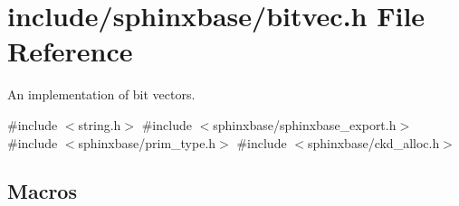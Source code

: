 \section{include/sphinxbase/bitvec.h File Reference}
\label{bitvec_8h}


An implementation of bit vectors.  


{\ttfamily \#include $<$string.\+h$>$}\newline
{\ttfamily \#include $<$sphinxbase/sphinxbase\+\_\+export.\+h$>$}\newline
{\ttfamily \#include $<$sphinxbase/prim\+\_\+type.\+h$>$}\newline
{\ttfamily \#include $<$sphinxbase/ckd\+\_\+alloc.\+h$>$}\newline
\subsection*{Macros}
